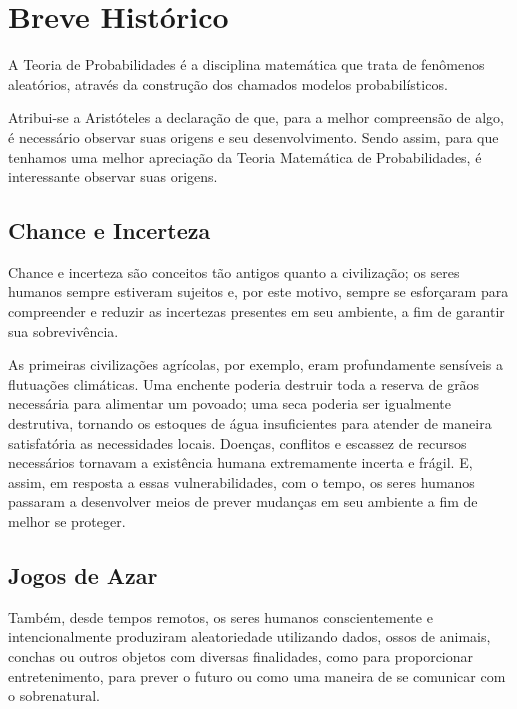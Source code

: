 \documentclass[
]{book}
\theoremstyle{definition}
\theoremstyle{definition}
\theoremstyle{definition}
\theoremstyle{remark}
\begin{document}
\hypertarget{breve-histuxf3rico}{%
\section{Breve Histórico}\label{breve-histuxf3rico}}

A Teoria de Probabilidades é a disciplina matemática que trata de fenômenos aleatórios, através da construção dos chamados modelos probabilísticos.

Atribui-se a Aristóteles a declaração de que, para a melhor compreensão de algo, é necessário observar suas origens e seu desenvolvimento. Sendo assim, para que tenhamos uma melhor apreciação da Teoria Matemática de Probabilidades, é interessante observar suas origens.

\hypertarget{chance-e-incerteza}{%
\subsection*{Chance e Incerteza}\label{chance-e-incerteza}}

Chance e incerteza são conceitos tão antigos quanto a civilização; os seres humanos sempre estiveram sujeitos e, por este motivo, sempre se esforçaram para compreender e reduzir as incertezas presentes em seu ambiente, a fim de garantir sua sobrevivência.

As primeiras civilizações agrícolas, por exemplo, eram profundamente sensíveis a flutuações climáticas. Uma enchente poderia destruir toda a reserva de grãos necessária para alimentar um povoado; uma seca poderia ser igualmente destrutiva, tornando os estoques de água insuficientes para atender de maneira satisfatória as necessidades locais. Doenças, conflitos e escassez de recursos necessários tornavam a existência humana extremamente incerta e frágil. E, assim, em resposta a essas vulnerabilidades, com o tempo, os seres humanos passaram a desenvolver meios de prever mudanças em seu ambiente a fim de melhor se proteger.

\hypertarget{jogos-de-azar}{%
\subsection*{Jogos de Azar}\label{jogos-de-azar}}

Também, desde tempos remotos, os seres humanos conscientemente e intencionalmente produziram aleatoriedade utilizando dados, ossos de animais, conchas ou outros objetos com diversas finalidades, como para proporcionar entretenimento, para prever o futuro ou como uma maneira de se comunicar com o sobrenatural.
\end{document}

